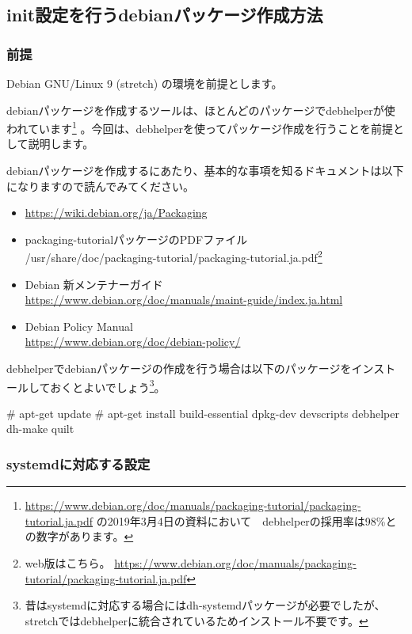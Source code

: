 \documentclass[mingoth,a4paper]{jsarticle}
\begin{document}
\subsection{init設定を行うdebianパッケージ作成方法}

\subsubsection{前提}

Debian GNU/Linux 9 (stretch) の環境を前提とします。


debianパッケージを作成するツールは、ほとんどのパッケージでdebhelperが使われています\footnote{\url{https://www.debian.org/doc/manuals/packaging-tutorial/packaging-tutorial.ja.pdf} の2019年3月4日の資料において　debhelperの採用率は98\%との数字があります。} 。今回は、debhelperを使ってパッケージ作成を行うことを前提として説明します。


debianパッケージを作成するにあたり、基本的な事項を知るドキュメントは以下になりますので読んでみてください。

\begin{itemize}
\item \url{https://wiki.debian.org/ja/Packaging}
\item packaging-tutorialパッケージのPDFファイル \\/usr/share/doc/packaging-tutorial/packaging-tutorial.ja.pdf\footnote{web版はこちら。 \url{https://www.debian.org/doc/manuals/packaging-tutorial/packaging-tutorial.ja.pdf}}
\item Debian 新メンテナーガイド \\\url{https://www.debian.org/doc/manuals/maint-guide/index.ja.html}
\item Debian Policy Manual \\\url{https://www.debian.org/doc/debian-policy/}
\end{itemize}  


debhelperでdebianパッケージの作成を行う場合は以下のパッケージをインストールしておくとよいでしょう\footnote{昔はsystemdに対応する場合にはdh-systemdパッケージが必要でしたが、stretchではdebhelperに統合されているためインストール不要です。}。


\begin{commandline}
# apt-get update
# apt-get install build-essential dpkg-dev devscripts debhelper dh-make quilt
\end{commandline}


\subsubsection{systemdに対応する設定}
\end{document}
